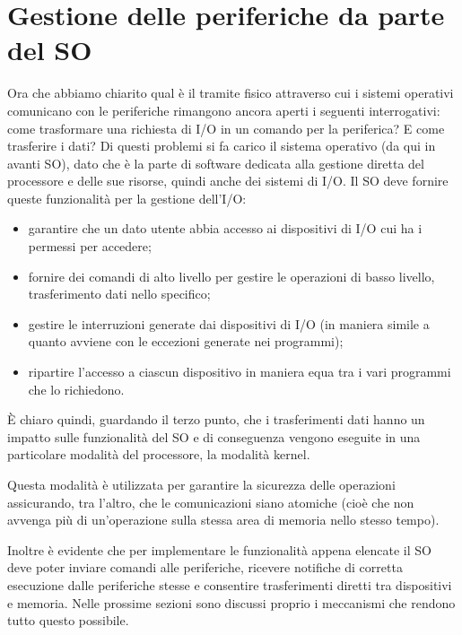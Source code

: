 \documentclass[class=book, crop=false, oneside]{standalone}
\begin{document}
\section{Gestione delle periferiche da parte del SO}
Ora che abbiamo chiarito qual è il tramite fisico attraverso cui i sistemi operativi comunicano con le periferiche rimangono ancora aperti i seguenti interrogativi: come trasformare una richiesta di I/O in un comando per la periferica? E come trasferire i dati? Di questi problemi si fa carico il sistema operativo (da qui in avanti SO), dato che è la parte di software dedicata alla gestione diretta del processore e delle sue risorse, quindi anche dei sistemi di I/O. Il SO deve fornire queste funzionalità per la gestione dell'I/O:
\begin{itemize}
	\item garantire che un dato utente abbia accesso ai dispositivi di I/O cui ha i permessi per accedere;
	\item fornire dei comandi di alto livello per gestire le operazioni di basso livello, trasferimento dati nello specifico;
	\item gestire le interruzioni generate dai dispositivi di I/O (in maniera simile a quanto avviene con le eccezioni generate nei programmi);
	\item ripartire l'accesso a ciascun dispositivo in maniera equa tra i vari programmi che lo richiedono.
\end{itemize}
È chiaro quindi, guardando il terzo punto, che i trasferimenti dati hanno un impatto sulle funzionalità del SO e di conseguenza vengono eseguite in una particolare modalità del processore, la modalità kernel.

Questa modalità è utilizzata per garantire la sicurezza delle operazioni assicurando, tra l'altro, che le comunicazioni siano atomiche (cioè che non avvenga più di un'operazione sulla stessa area di memoria nello stesso tempo).

Inoltre è evidente che per implementare le funzionalità appena elencate il SO deve poter inviare comandi alle periferiche, ricevere notifiche di corretta esecuzione dalle periferiche stesse e consentire trasferimenti diretti tra dispositivi e memoria. Nelle prossime sezioni sono discussi proprio i meccanismi che rendono tutto questo possibile.
\end{document}
